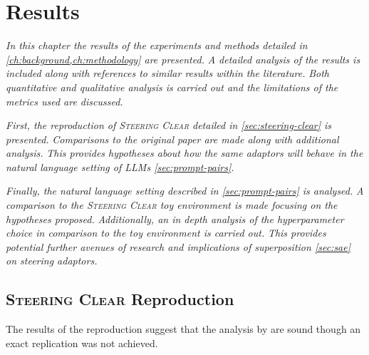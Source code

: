 \chapter{Results}
\label{ch:results}

\emph{In this chapter the results of the experiments and methods detailed in \cref{ch:background,ch:methodology} are presented.}
\emph{A detailed analysis of the results is included along with references to similar results within the literature.}
\emph{Both quantitative and qualitative analysis is carried out and the limitations of the metrics used are discussed.}

\emph{First, the reproduction of {\scshape Steering Clear} \citep{steering-clear} detailed in \cref{sec:steering-clear} is presented.}
\emph{Comparisons to the original paper are made along with additional analysis.}
\emph{This provides hypotheses about how the same adaptors will behave in the natural language setting of LLMs \cref{sec:prompt-pairs}.}

\emph{Finally, the natural language setting described in \cref{sec:prompt-pairs} is analysed.}
\emph{A comparison to the {\scshape Steering Clear} toy environment is made focusing on the hypotheses proposed.}
\emph{Additionally, an in depth analysis of the hyperparameter choice in comparison to the toy environment is carried out.}
\emph{This provides potential further avenues of research and implications of superposition \cref{sec:sae} on steering adaptors.}

\section{{\scshape Steering Clear} Reproduction}
\label{sec:steering-clear-res}

The results of the reproduction suggest that the analysis by \citet{steering-clear} are sound though an exact replication was not achieved.

